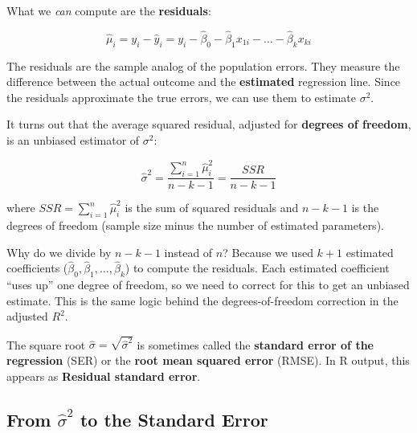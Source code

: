 \documentclass[
  letterpaper,
  DIV=11,
  numbers=noendperiod]{scrreprt}
\begin{document}
What we \emph{can} compute are the \textbf{residuals}:

\[\hat{\mu}_i = y_i - \hat{y}_i = y_i - \hat{\beta}_0 - \hat{\beta}_1 x_{1i} - \dots - \hat{\beta}_k x_{ki}\]

The residuals are the sample analog of the population errors. They
measure the difference between the actual outcome and the
\textbf{estimated} regression line. Since the residuals approximate the
true errors, we can use them to estimate \(\sigma^2\).

It turns out that the average squared residual, adjusted for
\textbf{degrees of freedom}, is an unbiased estimator of \(\sigma^2\):

\begin{tcolorbox}[enhanced jigsaw, arc=.35mm, bottomrule=.15mm, bottomtitle=1mm, breakable, colback=white, colbacktitle=quarto-callout-note-color!10!white, colframe=quarto-callout-note-color-frame, coltitle=black, left=2mm, leftrule=.75mm, opacityback=0, opacitybacktitle=0.6, rightrule=.15mm, title=\textcolor{quarto-callout-note-color}{\faInfo}\hspace{0.5em}{Estimating \(\sigma^2\)}, titlerule=0mm, toprule=.15mm, toptitle=1mm]

\[\hat{\sigma}^2 = \frac{\sum_{i=1}^{n} \hat{\mu}_i^2}{n - k - 1} = \frac{SSR}{n - k - 1}\]

where \(SSR = \sum_{i=1}^{n}\hat{\mu}_i^2\) is the sum of squared
residuals and \(n - k - 1\) is the degrees of freedom (sample size minus
the number of estimated parameters).

\end{tcolorbox}

Why do we divide by \(n - k - 1\) instead of \(n\)? Because we used
\(k + 1\) estimated coefficients
(\(\hat{\beta}_0, \hat{\beta}_1, \dots, \hat{\beta}_k\)) to compute the
residuals. Each estimated coefficient ``uses up'' one degree of freedom,
so we need to correct for this to get an unbiased estimate. This is the
same logic behind the degrees-of-freedom correction in the adjusted
\(R^2\).

The square root \(\hat{\sigma} = \sqrt{\hat{\sigma}^2}\) is sometimes
called the \textbf{standard error of the regression} (SER) or the
\textbf{root mean squared error} (RMSE). In R output, this appears as
\textbf{Residual standard error}.

\subsection{\texorpdfstring{From \(\hat{\sigma}^2\) to the Standard
Error}{From \textbackslash hat\{\textbackslash sigma\}\^{}2 to the Standard Error}}\label{from-hatsigma2-to-the-standard-error}
\end{document}
